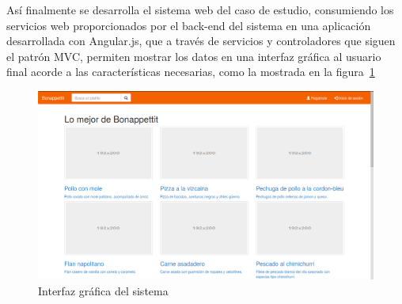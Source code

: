 Así finalmente se desarrolla el sistema web del caso de estudio, consumiendo los servicios web proporcionados por el back-end del sistema en una aplicación desarrollada con Angular.js, que a través de servicios y controladores que siguen el patrón MVC, permiten mostrar los datos en una interfaz gráfica al usuario final acorde a las características necesarias, como la mostrada en la figura~\ref{fig:final_bonappettit}


\begin{figure}[h!]
	\centering
	\includegraphics[width=16cm]{./images/p4_bonappettit}
	\caption{Interfaz gráfica del sistema}
	\label{fig:final_bonappettit}
\end{figure}

